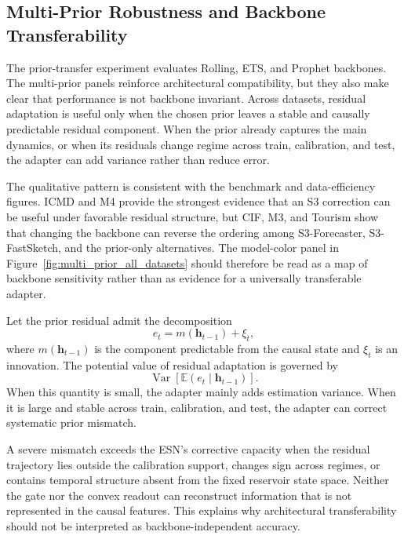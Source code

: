 \subsection{Multi-Prior Robustness and Backbone Transferability}
\label{subsec:multiprior_results}

The prior-transfer experiment evaluates Rolling, ETS, and Prophet backbones.
The multi-prior panels reinforce architectural compatibility, but they
also make clear that performance is not backbone invariant. Across datasets,
residual adaptation is useful only when the chosen prior leaves a stable and
causally predictable residual component. When the prior already captures the
main dynamics, or when its residuals change regime across train, calibration,
and test, the adapter can add variance rather than reduce error.

The qualitative pattern is consistent with the benchmark and data-efficiency
figures. ICMD and M4 provide the strongest evidence that an S3 correction can be
useful under favorable residual structure, but CIF, M3, and Tourism show that
changing the backbone can reverse the ordering among S3-Forecaster,
S3-FastSketch, and the prior-only alternatives. The model-color panel in
Figure~\ref{fig:multi_prior_all_datasets} should therefore be read as a map of
backbone sensitivity rather than as evidence for a universally transferable
adapter.

Let the prior residual admit the decomposition
\begin{equation}
e_t
=
m(\mathbf{h}_{t-1})+\xi_t,
\end{equation}
where $m(\mathbf{h}_{t-1})$ is the component predictable from the causal state
and $\xi_t$ is an innovation. The potential value of residual adaptation is
governed by
\begin{equation}
\operatorname{Var}
\left[
\mathbb{E}
\left(
e_t\mid\mathbf{h}_{t-1}
\right)
\right].
\end{equation}
When this quantity is small, the adapter mainly adds estimation variance.
When it is large and stable across train, calibration, and test, the adapter can
correct systematic prior mismatch.

A severe mismatch exceeds the ESN's corrective capacity when the residual
trajectory lies outside the calibration support, changes sign across regimes,
or contains temporal structure absent from the fixed reservoir state space.
Neither the gate nor the convex readout can reconstruct information that is not
represented in the causal features. This explains why architectural
transferability should not be interpreted as backbone-independent accuracy.

